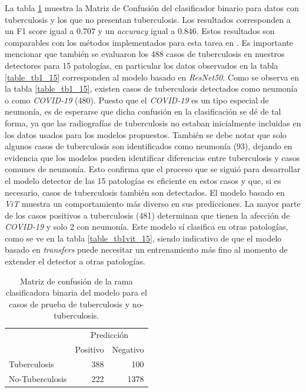 La tabla \ref{table_tb1} muestra la Matriz de Confusión del clasificador binario para datos con
tuberculosis y los que no presentan tuberculosis. Los resultados corresponden a un F1 score igual a
$0.707$ y un \textit{accuracy} igual a $0.846$. Estos resultados son comparables con los métodos
implementados para esta tarea en \cite{puttagunta2021detection}. Es importante mencionar que también
se evaluaron los 488 casos de tuberculosis en nuestros detectores para 15 patologías, en particular
los datos observados en la tabla \ref{table_tb1_15} corresponden al modelo basado en \textit{ResNet50}.
Como se observa en la tabla \ref{table_tb1_15}, existen casos de tuberculosis detectados como neumonía
o como \textit{COVID-19} (480). Puesto que el \textit{COVID-19} es un tipo especial de neumonía, es de
esperarse que dicha confusión en la clasificación se dé de tal forma, ya que las radiografías de
tuberculosis no estaban inicialmente incluidas en los datos usados para los modelos propuestos. También
se debe notar que solo algunos casos de tuberculosis son identificados como neumonía (93), dejando en
evidencia que los modelos pueden identificar diferencias entre tuberculosis y casos comunes de neumonía.
Esto confirma que el proceso que se siguió para desarrollar el modelo detector de las 15 patologías es
eficiente en estos casos y que, si es necesario, casos de tuberculosis también son detectados. El modelo
basado en \textit{ViT} muestra un comportamiento más diverso en sus predicciones. La mayor parte de los
casos positivos a tuberculosis (481) determinan que tienen la afección de \textit{COVID-19} y solo 2 con
neumonía. Este modelo sí clasifica en otras patologías, como se ve en la tabla \ref{table_tb1vit_15},
siendo indicativo de que el modelo basado en \textit{transfers} puede necesitar un entrenamiento más fino
al momento de extender el detector a otras patologías.


\begin{table}[!ht]
    \centering
    \begin{tabular}{lcr}
                                          & \multicolumn{2}{c}{Predicción}                                \\ \cline{2-3}
    \multicolumn{1}{l|}{}                 & \multicolumn{1}{c|}{Positivo} & \multicolumn{1}{c|}{Negativo} \\ \hline
    \multicolumn{1}{|l|}{Tuberculosis}    & \multicolumn{1}{r|}{388}      & \multicolumn{1}{r|}{100}      \\ \hline
    \multicolumn{1}{|l|}{No-Tuberculosis} & \multicolumn{1}{r|}{222}      & \multicolumn{1}{r|}{1378}     \\ \hline
    \end{tabular}
    \caption{Matriz de confusión de la rama clasificadora binaria del modelo para el casos de prueba
             de tuberculosis y no-tuberculosis.}
    \label{table_tb1}
\end{table}


